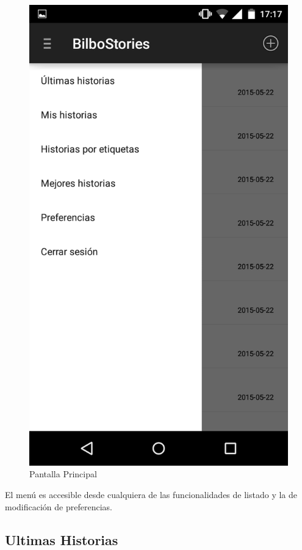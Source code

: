\documentclass[11pt,a4paper, titlepage]{article}
\begin{document}
	\begin{figure}[hbtp]
		\centering
		\includegraphics[scale = 0.25 ]{img/3}
		\caption{Pantalla Principal}
		\label{p1}
	\end{figure}
	
	El menú es accesible desde cualquiera de las funcionalidades de listado y la de modificación de preferencias.
	
	\FloatBarrier
	
	\newpage
	\subsection[Ultimas Historias]{Ultimas Historias}
	
\end{document}
